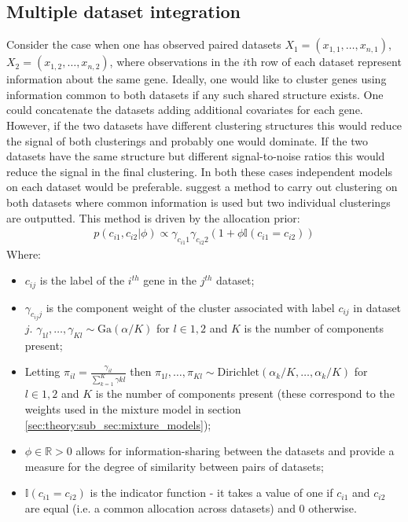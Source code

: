 \documentclass[12pt]{article} %
\begin{document}
	\subsection{Multiple dataset integration}
	Consider the case when one has observed paired datasets $X_1 = (x_{1,1},\ldots,x_{n,1})$, $X_2 = (x_{1,2},\ldots,x_{n,2})$, where observations in the $i$th row of each dataset represent information about the same gene. Ideally, one would like to cluster genes using information common to both datasets if any such shared structure exists. One could concatenate the datasets adding additional covariates for each gene. However, if the two datasets have different clustering structures this would reduce the signal of both clusterings and probably one would dominate. If the two datasets have the same structure but different signal-to-noise ratios this would reduce the signal in the final clustering. In both these cases independent models on each dataset would be preferable. \citet{KirkBayesiancorrelatedclustering2012} suggest a method to carry out clustering on both datasets where common information is used but two individual clusterings are outputted. This method is driven by the allocation prior:
	\begin{align} \label{allocation_prior_l_2}
	p(c_{i1}, c_{i2} | \phi ) \propto \gamma_{c_{i1}1} \gamma_{c_{i2}2} (1 + \phi \mathbb{I}(c_{i1} = c_{i2}))
	\end{align}
	Where:
	\begin{itemize}
		\item $c_{ij}$ is the label of the $i^{th}$ gene in the $j^{th}$ dataset;
		\item $\gamma_{c_{ij}j}$ is the component weight of the cluster associated with label $c_{ij}$ in dataset $j$. $\gamma_{1l},\ldots,\gamma_{Kl} \sim \text{Ga}(\alpha / K)$ for $l \in {1,2}$ and $K$ is the number of components present;
		\item Letting $\pi_{il} = \frac{\gamma_{il}}{\sum_{k=1}^K \gamma{kl}}$ then $\pi_{1l},\ldots,\pi_{Kl} \sim \text{Dirichlet}(\alpha_k / K, \ldots, \alpha_k / K)$ for $l \in {1,2}$ and $K$ is the number of components present (these correspond to the weights used in the mixture model in section \ref{sec:theory:sub_sec:mixture_models});
		\item $\phi \in \mathbb{R} > 0$  allows for information-sharing between the datasets and provide  a  measure for the degree of similarity between pairs of datasets;
		\item $\mathbb{I}(c_{i1} = c_{i2})$ is the indicator function - it takes a value of one if $c_{i1}$ and $c_{i2}$ are equal (i.e. a common allocation across datasets) and 0 otherwise.
	\end{itemize}
\end{document}
